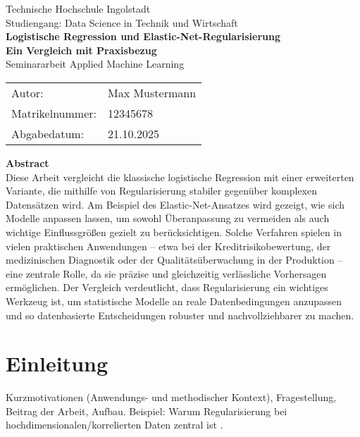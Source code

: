 \documentclass[12pt,a4paper]{article}
\begin{document}
\begin{titlepage}
  \centering
  {\Large Technische Hochschule Ingolstadt}\\[6pt]
  {\large Studiengang: Data Science in Technik und Wirtschaft}\\[28pt]

  {\huge \textbf{Logistische Regression und Elastic-Net-Regularisierung}}\\[10pt]
  {\LARGE \textbf{Ein Vergleich mit Praxisbezug}}\\[32pt]

  {\large Seminararbeit Applied Machine Learning}\\[24pt]

  \begin{tabular}{ll}
    Autor: & Max Mustermann \\
    Matrikelnummer: & 12345678 \\
    Abgabedatum: & 21.10.2025\\[32pt]
  \end{tabular}

  \begin{minipage}{0.85\textwidth}
    \textbf{Abstract} \\[4pt]
    Diese Arbeit vergleicht die klassische logistische Regression mit einer erweiterten Variante, die mithilfe von Regularisierung stabiler gegenüber komplexen Datensätzen wird. Am Beispiel des Elastic-Net-Ansatzes wird gezeigt, wie sich Modelle anpassen lassen, um sowohl Überanpassung zu vermeiden als auch wichtige Einflussgrößen gezielt zu berücksichtigen. Solche Verfahren spielen in vielen praktischen Anwendungen – etwa bei der Kreditrisikobewertung, der medizinischen Diagnostik oder der Qualitätsüberwachung in der Produktion – eine zentrale Rolle, da sie präzise und gleichzeitig verlässliche Vorhersagen ermöglichen. Der Vergleich verdeutlicht, dass Regularisierung ein wichtiges Werkzeug ist, um statistische Modelle an reale Datenbedingungen anzupassen und so datenbasierte Entscheidungen robuster und nachvollziehbarer zu machen.
  \end{minipage}

\end{titlepage}

\section{Einleitung}
Kurzmotivationen (Anwendungs- und methodischer Kontext), Fragestellung,
Beitrag der Arbeit, Aufbau. Beispiel: Warum Regularisierung bei
hochdimensionalen/korrelierten Daten zentral ist \citep{Tibshirani1996Lasso, Zou2005ElasticNet}.
\end{document}
